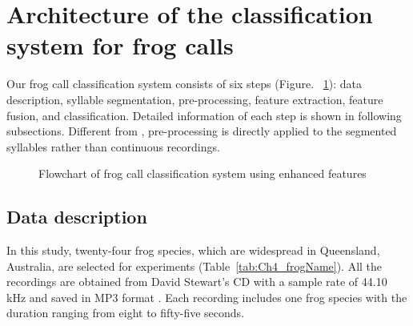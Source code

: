 \section{Architecture of the classification system for frog calls}
Our frog call classification system consists of six steps (Figure.~ \ref{fig:Ch4_flowchart}): data description, syllable segmentation, pre-processing,  feature extraction, feature fusion, and classification. Detailed information of each step is shown in following subsections. Different from \citep{huang2009frog}, pre-processing is directly applied to the segmented syllables rather than continuous recordings.

\begin{figure}[htb!] %
\caption{Flowchart of frog call classification system using enhanced features}
\label{fig:Ch4_flowchart} 
\end{figure}


\subsection{Data description}
In this study, twenty-four frog species, which are widespread in Queensland, Australia, are selected for experiments (Table~\ref{tab:Ch4_frogName}). All the recordings are obtained from David Stewart's CD with a sample rate of 44.10 kHz and saved in MP3 format \citep{CD}. Each recording includes one frog species with the duration ranging from eight to fifty-five seconds.

